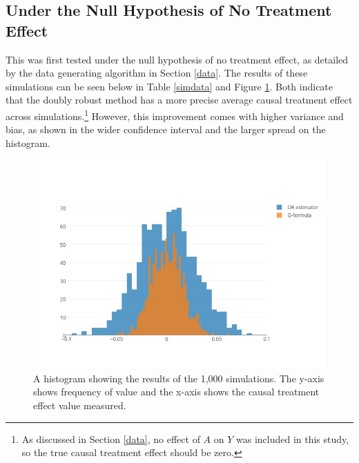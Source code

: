 \subsection{Under the Null Hypothesis of No Treatment Effect} 
This was first tested under the null hypothesis of no treatment effect, as detailed by the data generating algorithm in Section \ref{data}.  The results of these simulations can be seen below in Table \ref{simdata} and Figure \ref{bighistogram}.  Both indicate that the doubly robust method has a more precise average causal treatment effect across simulations.\footnote{As discussed in Section \ref{data}, no effect of $A$ on $Y$ was included in this study, so the true causal treatment effect should be zero.}  However, this improvement comes with higher variance and bias, as shown in the wider confidence interval and the larger spread on the histogram.  

\begin{figure}[h!]
\includegraphics[width = \linewidth]{figures/overlaid_histogram.jpeg}
\caption[Histogram of simulation results under the null hypothesis]{A histogram showing the results of the 1,000 simulations.  The y-axis shows frequency of value and the x-axis shows the causal treatment effect value measured.}
\label{bighistogram}
\end{figure} 

